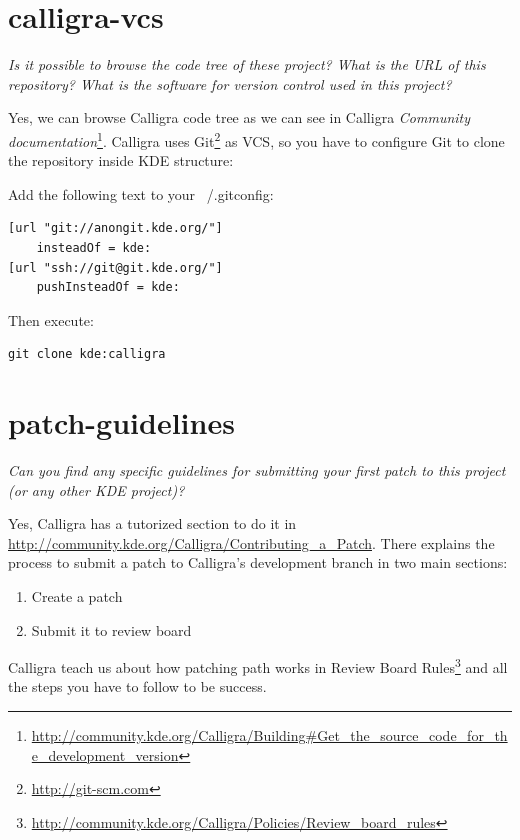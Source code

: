 \documentclass[11pt]{scrartcl}
\begin{document}
\section{calligra-vcs}
\label{sec:q-01}

\emph{Is it possible to browse the code tree of these project? What is the URL of this repository? What is the software for version control used in this project?}

\par Yes, we can browse Calligra code tree as we can see in Calligra \emph{Community documentation}\footnote{\url{http://community.kde.org/Calligra/Building\#Get_the_source_code_for_the_development_version}}. Calligra uses Git\footnote{\url{http://git-scm.com}} as VCS, so you have to configure Git to clone the repository inside KDE structure:

Add the following text to your ~/.gitconfig:
\begin{Verbatim}[frame=single]
[url "git://anongit.kde.org/"]
    insteadOf = kde:
[url "ssh://git@git.kde.org/"]
    pushInsteadOf = kde:
\end{Verbatim}

Then execute:
\begin{Verbatim}[frame=single]
 git clone kde:calligra
\end{Verbatim}

\section{patch-guidelines}
\label{sec:q-02}

\emph{Can you find any specific guidelines for submitting your first patch to this project (or any other KDE project)?}

\par Yes, Calligra has a tutorized section to do it in \url{http://community.kde.org/Calligra/Contributing_a_Patch}.
There explains the process to submit a patch to Calligra's development branch in two main sections:

\begin{enumerate}
	\item Create a patch
	\item Submit it to review board
\end{enumerate}

\par Calligra teach us about how patching path works in Review Board Rules\footnote{\url{http://community.kde.org/Calligra/Policies/Review_board_rules}} and all the steps you have to follow to be success.
\end{document}
